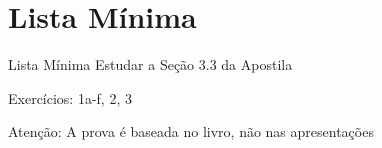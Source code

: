 \section{Lista Mínima}

\begin{frame}{Lista Mínima}
  Estudar a Seção 3.3 da Apostila

  Exercícios: 1a-f, 2, 3

  \vfill
  Atenção: A prova é baseada no livro, não nas apresentações
\end{frame}


